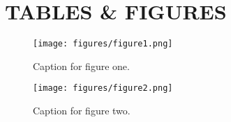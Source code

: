 \section{TABLES \& FIGURES}	%

\setcounter{table}{0}		%
\setcounter{figure}{0}		%


\begin{figure}[H]			%
	\centering
	\texttt{[image: figures/figure1.png]}
    \caption{Caption for figure one.}
    \label{fig:figure1}
\end{figure}

\begin{figure}[H]			%
	\centering
	\texttt{[image: figures/figure2.png]}
    \caption{Caption for figure two.}
    \label{fig:figure2}
\end{figure}

\clearpage